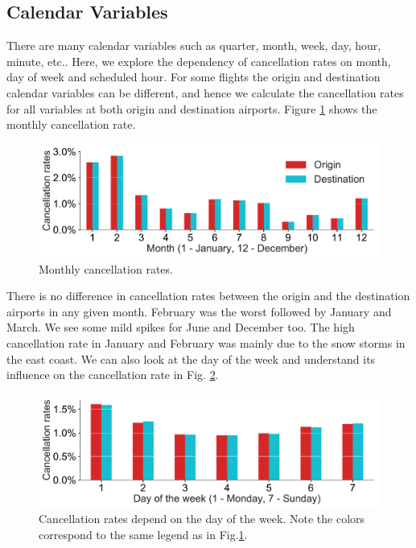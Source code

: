 \documentclass[12pt]{article}
\begin{document}
\subsection{Calendar Variables}
\label{subsec:calvar}
There are many calendar variables such as quarter, month, week, day, hour, minute, etc.. Here, we explore the dependency of cancellation rates on month, day of week and scheduled hour. For some flights the origin and destination calendar variables can be different, and hence we calculate the cancellation rates for all variables at both origin and destination airports. Figure \ref{fig:monthlycanrate} shows the monthly cancellation rate.  
\begin{figure}[h!]
\begin{center}
\includegraphics[width=6in]{monthly_canrate.pdf}
\end{center}
\caption{\label{fig:monthlycanrate}
Monthly cancellation rates.}
\end{figure}
There is no difference in cancellation rates between the origin and the destination airports in any given month. February was the worst followed by January and March. We see some mild spikes for June and December too. The high cancellation rate in January and February was mainly due to the snow storms in the east coast. We can also look at the day of the week and understand its influence on the cancellation rate in Fig. \ref{fig:weeklycanrate}. 
\begin{figure}[h!]
\begin{center}
\includegraphics[width=6in]{weekly_canrate.pdf}
\end{center}
\caption{\label{fig:weeklycanrate}
Cancellation rates depend on the day of the week. Note the colors correspond to the same legend as in Fig.\ref{fig:monthlycanrate}.}
\end{figure}
\end{document}

